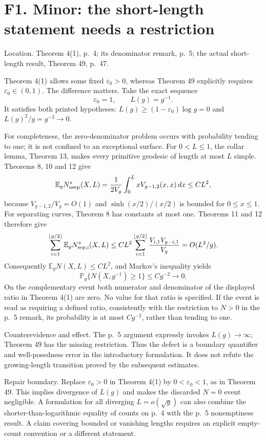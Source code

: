 \documentclass[10pt]{article}
\begin{document}
\section*{F1. Minor: the short-length statement needs a restriction}
Location. Theorem 4(1), p. 4; its denominator remark, p. 5; the actual short-length result, Theorem 49, p. 47.\par
Theorem 4(1) allows some fixed \(\varepsilon_0>0\), whereas Theorem 49 explicitly requires \(\varepsilon_0\in(0,1)\). The difference matters. Take the exact sequence \[\varepsilon_0=1,\qquad L(g)=g^{-1}.\] It satisfies both printed hypotheses: \(L(g)\ge(1-\varepsilon_0)\log g=0\) and \(L(g)^2/g=g^{-3}\to0\).\par
For completeness, the zero-denominator problem occurs with probability tending to one; it is not confined to an exceptional surface. For \(0<L\le1\), the collar lemma, Theorem 13, makes every primitive geodesic of length at most \(L\) simple. Theorems 8, 10 and 12 give \[\mathbb E_g N_{\rm nsep}^{s}(X,L)
 =\frac1{2V_g}\int_0^L xV_{g-1,2}(x,x)\,dx
 \le C L^2,\] because \(V_{g-1,2}/V_g=O(1)\) and \(\sinh(x/2)/(x/2)\) is bounded for \(0\le x\le1\). For separating curves, Theorem 8 has constants at most one. Theorems 11 and 12 therefore give \[\sum_{i=1}^{\lfloor g/2\rfloor}\mathbb E_g N_{\rm sep,i}^{s}(X,L)
 \le C L^2\sum_{i=1}^{\lfloor g/2\rfloor}
                   \frac{V_{i,1}V_{g-i,1}}{V_g}
 =O(L^2/g).\] Consequently \(\mathbb E_gN(X,L)\le CL^2\), and Markov’s inequality yields \[\mathbb P_g\{N(X,g^{-1})\ge1\}\le Cg^{-2}\longrightarrow0.\] On the complementary event both numerator and denominator of the displayed ratio in Theorem 4(1) are zero. No value for that ratio is specified. If the event is read as requiring a defined ratio, consistently with the restriction to \(N>0\) in the p. 5 remark, its probability is at most \(Cg^{-2}\), rather than tending to one.\par
Counterevidence and effect. The p. 5 argument expressly invokes \(L(g)\to\infty\); Theorem 49 has the missing restriction. Thus the defect is a boundary quantifier and well-posedness error in the introductory formulation. It does not refute the growing-length transition proved by the subsequent estimates.\par
Repair boundary. Replace \(\varepsilon_0>0\) in Theorem 4(1) by \(0<\varepsilon_0<1\), as in Theorem 49. This implies divergence of \(L(g)\) and makes the discarded \(N=0\) event negligible. A formulation for all diverging \(L=o(\sqrt g)\) can also combine the shorter-than-logarithmic equality of counts on p. 4 with the p. 5 nonemptiness result. A claim covering bounded or vanishing lengths requires an explicit empty-count convention or a different statement.\par
\end{document}
